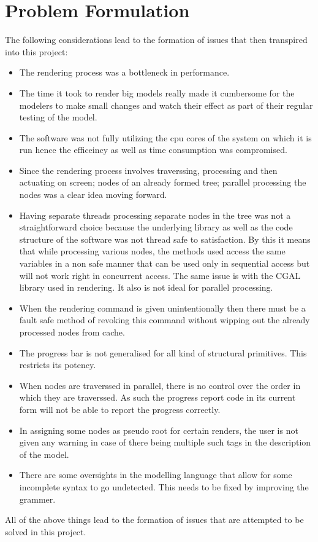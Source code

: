 \section{Problem Formulation}
The following considerations lead to the formation of issues that then transpired into this project:
\begin{itemize}
	\item The rendering process was a bottleneck in performance.
	\item The time it took to render big models really made it cumbersome for the modelers to make small changes and watch their effect as part of their regular testing of the model.
	\item The software was not fully utilizing the cpu cores of the system on which it is run hence the efficeincy as well as time consumption was compromised.
	\item Since the rendering process involves traverssing, processing and then actuating on screen; nodes of an already formed tree; parallel processing the nodes was a clear idea moving forward.
	\item Having separate threads processing separate nodes in the tree was not a straightforward choice because the underlying library as well as the code structure of the software was not thread safe to satisfaction. By this it means that while processing various nodes, the methods used access the same variables in a non safe manner that can be used only in sequential access but will not work right in concurrent access. The same issue is with the CGAL library used in rendering. It also is not ideal for parallel processing.
	\item When the rendering command is given unintentionally then there must be a fault safe method of revoking this command without wipping out the already processed nodes from cache.
	\item The progress bar is not generalised for all kind of structural primitives. This restricts its potency.
	\item When nodes are traverssed in parallel, there is no control over the order in which they are traverssed. As such the progress report code in its current form will not be able to report the progress correctly.
	\item In assigning some nodes as pseudo root for certain renders, the user is not given any warning in case of there being multiple such tags in the description of the model.
	\item There are some oversights in the modelling language that allow for some incomplete syntax to go undetected. This needs to be fixed by improving the grammer.
\end{itemize}
All of the above things lead to the formation of issues that are attempted to be solved in this project.
